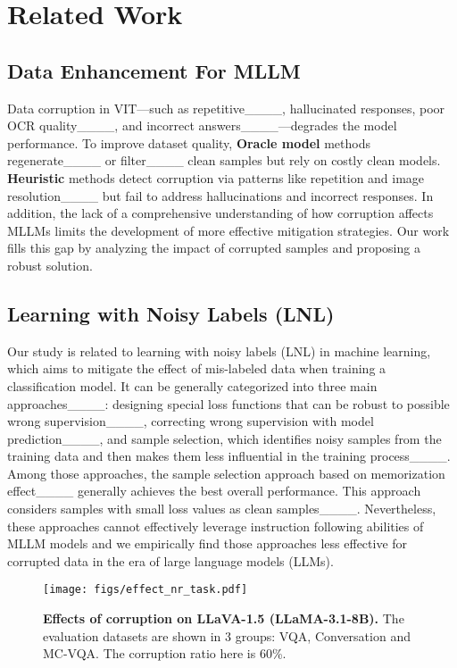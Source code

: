 \section{Related Work}
\subsection{Data Enhancement For MLLM}
Data corruption in VIT—such as repetitive____, hallucinated responses, poor OCR quality____, and incorrect answers____—degrades the model performance. To improve dataset quality, \textbf{Oracle model} methods regenerate____ or filter____ clean samples but rely on costly clean models. \textbf{Heuristic} methods detect corruption via patterns like repetition and image resolution____ but fail to address hallucinations and incorrect responses. In addition, the lack of a comprehensive understanding of how corruption affects MLLMs limits the development of more effective mitigation strategies. Our work fills this gap by analyzing the impact of corrupted samples and proposing a robust solution.



\subsection{Learning with Noisy Labels (LNL)}
Our study is related to learning with noisy labels (LNL) in machine learning, which aims to mitigate the effect of mis-labeled data when training a classification model. It can be generally categorized into three main approaches____:
designing special loss functions that can be robust to possible wrong supervision____, 
correcting wrong supervision with model prediction____,
and sample selection, which identifies noisy samples from the training data and then makes them less influential in the training process____. 
Among those approaches, the sample selection approach based on memorization effect____ generally achieves the best overall performance.  
This approach considers samples with small loss values as clean samples____. 
Nevertheless, these approaches cannot effectively leverage instruction following abilities of MLLM models and we empirically find those approaches less effective for corrupted data in the era of large language models (LLMs). 

\begin{figure*}[!]
\centering
\texttt{[image: figs/effect\_nr\_task.pdf]}
\vspace{-.3in}
\caption{\textbf{Effects of corruption on LLaVA-1.5 (LLaMA-3.1-8B).} The evaluation datasets are shown in 3 groups: VQA, Conversation and MC-VQA. The corruption ratio here is 60\%. }
\label{fig:effect_nr_task}
\end{figure*}
